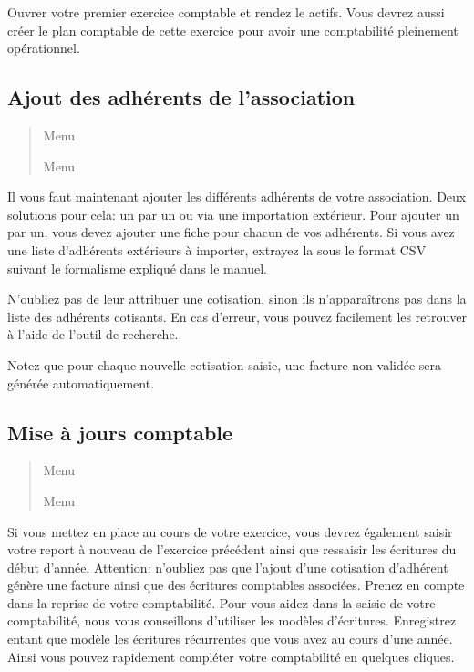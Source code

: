 \documentclass[a4paper,10pt,oneside,french]{sphinxmanual}
\begin{document}
Ouvrer votre premier exercice comptable et rendez le actifs.
Vous devrez aussi créer le plan comptable de cette exercice pour avoir une comptabilité pleinement opérationnel.


\subsection{Ajout des adhérents de l’association}
\label{\detokenize{asso/first_step:ajout-des-adherents-de-l-association}}\begin{quote}

Menu 

Menu 
\end{quote}

Il vous faut maintenant ajouter les différents adhérents de votre association.
Deux solutions pour cela: un par un ou via une importation extérieur.
Pour ajouter un par un, vous devez ajouter une fiche pour chacun de vos adhérents.
Si vous avez une liste d’adhérents extérieurs à importer, extrayez la sous le format CSV suivant le formalisme expliqué dans le manuel.

N’oubliez pas de leur attribuer une cotisation, sinon ils n’apparaîtrons pas dans la liste des adhérents cotisants.
En cas d’erreur, vous pouvez facilement les retrouver à l’aide de l’outil de recherche.

Notez que pour chaque nouvelle cotisation saisie, une facture non-validée sera générée automatiquement.


\subsection{Mise à jours comptable}
\label{\detokenize{asso/first_step:mise-a-jours-comptable}}\begin{quote}

Menu 

Menu 
\end{quote}

Si vous mettez en place  au cours de votre exercice, vous devrez également saisir votre report à nouveau de l’exercice précédent ainsi que ressaisir les écritures du début d’année.
Attention: n’oubliez pas que l’ajout d’une cotisation d’adhérent génère une facture ainsi que des écritures comptables associées. Prenez en compte dans la reprise de votre comptabilité.
Pour vous aidez dans la saisie de votre comptabilité, nous vous conseillons d’utiliser les modèles d’écritures. Enregistrez entant que modèle les écritures récurrentes que vous avez au cours d’une année. Ainsi vous pouvez rapidement compléter votre comptabilité en quelques cliques.
\end{document}
